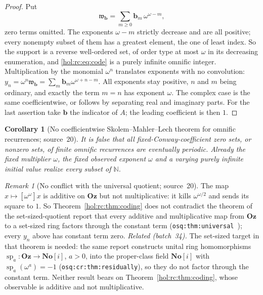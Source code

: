 \documentclass[11pt]{article}
\numberwithin{equation}{section}
\newtheorem{corollary}[theorem]{Corollary}
\theoremstyle{definition}
\theoremstyle{remark}
\newtheorem{remark}[theorem]{Remark}
\newcommand{\N}{\mathbb N}
\newcommand{\No}{\mathbf{No}}
\newcommand{\Oz}{\mathbf{Oz}}
\begin{document}
\begin{proof}
Put
\begin{equation}\label{hol:rc:eq:code}
 \mathfrak w_{\mathbf b}=\sum_{m\ge0}\mathbf b_m\,\omega^{\omega-m},
\end{equation}
zero terms omitted. The exponents $\omega-m$ strictly decrease and are all
positive; every nonempty subset of them has a greatest element, the one of
least index. So the support is a reverse well-ordered set, of order type at
most $\omega$ in its decreasing enumeration, and \eqref{hol:rc:eq:code} is a
purely infinite omnific integer. Multiplication by the monomial $\omega^n$
translates exponents with no convolution:
$y_n=\omega^n\mathfrak w_{\mathbf b}=\sum_m\mathbf b_m\omega^{\omega+n-m}$. All
exponents stay positive, $n$ and $m$ being ordinary, and exactly the term
$m=n$ has exponent $\omega$. The complex case is the same coefficientwise, or
follows by separating real and imaginary parts. For the last assertion take
$\mathbf b$ the indicator of $A$; the leading coefficient is then $1$.
\end{proof}

\begin{corollary}[No coefficientwise Skolem--Mahler--Lech theorem for
omnific recurrences; source~20]\label{hol:rc:cor:nosml}
It is false that all fixed-Conway-coefficient zero sets, or nonzero sets, of
finite omnific recurrences are eventually periodic. Already the fixed
multiplier $\omega$, the fixed observed exponent $\omega$ and a varying purely
infinite initial value realize every subset of $\N$.
\end{corollary}

\begin{remark}[No conflict with the universal quotient; source~20]
\label{hol:rc:rem:quotients}
The map $x\mapsto[\omega^\omega]x$ is additive on $\Oz$ but not
multiplicative: it kills $\omega^{\omega/2}$ and sends its square to $1$. So
Theorem~\ref{hol:rc:thm:coding} does not contradict the theorem of the
set-sized-quotient report that every additive and multiplicative map from
$\Oz$ to a set-sized ring factors through the constant term
(\texttt{osq:thm:universal}~\cite{repoosq}); every $y_n$ above has constant
term zero. \emph{Related (batch~34).} The set-sized target in that theorem is
needed: the same report constructs unital ring homomorphisms
$\operatorname{sp}_a:\Oz\to\No[i]$, $a>0$, into the proper-class field $\No[i]$ with
$\operatorname{sp}_a(\omega^a)=-1$ (\texttt{osq:cr:thm:residually}), so they do
not factor through the constant term. Neither result bears on
Theorem~\ref{hol:rc:thm:coding}, whose observable is additive and not
multiplicative.
\end{remark}
\end{document}
